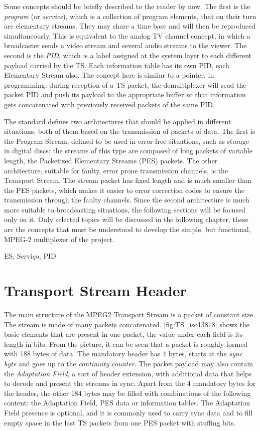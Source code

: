 \documentclass[
	12pt,				%
	openright,			%
	twoside,			%
	a4paper,			%
	brazil,
	french,				%
	english
	]{abntex2}
\begin{document}
Some concepts should be briefly described to the reader by now. The first is the \textit{program} (or \textit{service}), which is a collection of program elements, that on their turn are elementary streams. They may share a time base and will then be reproduced simultaneously. This is equivalent to the analog TV channel concept, in which a broadcaster sends a video stream and several audio streams to the viewer. The second is the \textit{PID}, which is a label assigned at the system layer to each different payload carried by the TS. Each information table has its own PID, each Elementary Stream also. The concept here is similar to a pointer, in programming: during reception of a TS packet, the demultiplexer will read the packet PID and push its payload to the appropriate buffer so that information gets concatenated with previously received packets of the same PID.

The standard defines two architectures that should be applied in different situations, both of them based on the transmission of packets of data. The first is the Program Stream, defined to be used in error free situations, such as storage in digital discs: the streams of this type are composed of long packets of variable length, the Packetized Elementary Streams (PES) packets. The other architecture, suitable for faulty, error prone transmission channels, is the Transport Stream. The stream packet has fixed length and is much smaller than the PES packets, which makes it easier to error correction codes to ensure the transmission through the faulty channels. Since the second architecture is much more suitable to broadcasting situations, the following sections will be focused only on it. Only selected topics will be discussed in the following chapter, these are the concepts that must be understood to develop the simple, but functional, MPEG-2 multiplexer of the project.

ES, Serviço, PID

\section{Transport Stream Header}
\label{ts_header}
The main structure of the MPEG2 Transport Stream is a packet of constant size. The stream is made of many packets concatenated. \autoref{fig:TS_iso13818} shows the basic elements that are present in one packet, the value under each field is its length in bits. From the picture, it can be seen that a packet is roughly formed with 188 bytes of data. The mandatory header has 4 bytes, starts at the \textit{sync byte} and goes up to the \textit{continuity counter}. The packet payload may also contain the \textit{Adaptation Field}, a sort of header extension, with additional data that helps to decode and present the streams in sync. Apart from the 4 mandatory bytes for the header, the other 184 bytes may be filled with combinations of the following content: the Adaptation Field, PES data or information tables. The Adaptation Field presence is optional, and it is commonly used to carry sync data and to fill empty space in the last TS packets from one PES packet with stuffing bits.
\end{document}

